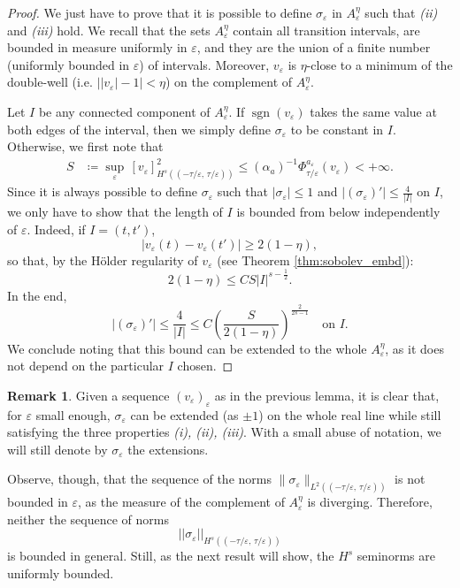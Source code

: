 \documentclass{article}
\theoremstyle{definition}
\newtheorem{Remark}[Theorem]{Remark}
\newcommand{\e}{\varepsilon}
\def\e{\varepsilon}
\newcommand{\sgn}{\operatorname{sgn}}
\begin{document}
\begin{proof} We just have to prove that it is possible to define $\sigma_\e$ in $A^\eta_\e$ such that \textit{(ii)} and \textit{(iii)} hold. We recall that the sets $A^\eta_\e$ contain all transition intervals, are bounded in measure uniformly in $\e$, and they are the union of a finite number (uniformly bounded in $\e$) of intervals. Moreover, $v_\e$ is $\eta$-close to a minimum of the double-well (i.e. $\left||v_\e|-1\right|<\eta$) on the complement of $A^\eta_\e$.

Let $I$ be any connected component of $A^\eta_\e$. If $\sgn(v_\e)$ takes the same value at both edges of the interval, then we simply define $\sigma_\e$ to be constant in $I$. Otherwise, we first note that
\begin{align*}
    S&\coloneqq \sup_\e \,[v_\e]^2_{H^s((-\tau/\e,\,\tau/\e))} \leq (\alpha_a)^{-1}\Phi^{a_{\scriptstyle \e}}_{\tau/\e}(v_\e)<+\infty.
\end{align*}
Since it is always possible to define $\sigma_\e$ such that $|\sigma_\e|\leq 1$ and $|(\sigma_\e)'|\leq \frac{4}{|I|}$ on $I$, we only have to show that the length of $I$ is bounded from below independently of $\e$.
Indeed, if $I=(t,t')$,
\begin{equation*}
    |v_\e(t )-v_\e(t')| \geq   2(1-\eta),
\end{equation*}
      so that, by the Hölder regularity of $v_\e$ (see Theorem \ref{thm:sobolev_embd}):
    \[2(1-\eta)\leq CS |I|^{s-\frac{1}{2}}.\]
In the end,
    \[|(\sigma_\e)'|\leq \frac{4}{|I|}\leq C\left(\frac{S}{2(1-\eta)}\right)^\frac{2}{2s-1}\quad \text{on }I.\]
    We conclude noting that this bound can be extended to the whole $A^\eta_\e$, as it does not depend on the particular $I$ chosen.
\end{proof}

 \begin{Remark}\label{rmk:sigma_properties} Given a sequence $(v_\e)_\e$ as in the previous lemma, it is clear that, for $\e$ small enough, $\sigma_\e$ can be extended (as $\pm 1$) on the whole real line while still satisfying the three properties \textit{(i), (ii), (iii)}. With a small abuse of notation, we will still denote by $\sigma_\e$ the extensions.
 
    Observe, though, that the sequence of the norms $\|\sigma_\e\|_{L^2((-\tau/\e,\,\tau/\e))}$ is not bounded in $\e$, as the measure of the complement of $A^\eta_\e$ is diverging. 
    Therefore, neither the sequence of norms
    \[ ||\sigma_\e||_{H^s((-\tau/\e,\,\tau/\e))}\]
     is bounded in general. Still, as the next result will show, the $H^s$ seminorms are uniformly bounded.
\end{Remark}
\end{document}
